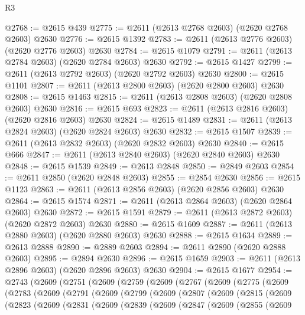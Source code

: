 \begin{lexlean}{R3}
\begin{coremodule}
@2768 := @2615 @439
@2775 := @2611 (@2613 @2768 @2603) (@2620 @2768 @2603) @2630
@2776 := @2615 @1392
@2783 := @2611 (@2613 @2776 @2603) (@2620 @2776 @2603) @2630
@2784 := @2615 @1079
@2791 := @2611 (@2613 @2784 @2603) (@2620 @2784 @2603) @2630
@2792 := @2615 @1427
@2799 := @2611 (@2613 @2792 @2603) (@2620 @2792 @2603) @2630
@2800 := @2615 @1101
@2807 := @2611 (@2613 @2800 @2603) (@2620 @2800 @2603) @2630
@2808 := @2615 @1463
@2815 := @2611 (@2613 @2808 @2603) (@2620 @2808 @2603) @2630
@2816 := @2615 @693
@2823 := @2611 (@2613 @2816 @2603) (@2620 @2816 @2603) @2630
@2824 := @2615 @1489
@2831 := @2611 (@2613 @2824 @2603) (@2620 @2824 @2603) @2630
@2832 := @2615 @1507
@2839 := @2611 (@2613 @2832 @2603) (@2620 @2832 @2603) @2630
@2840 := @2615 @666
@2847 := @2611 (@2613 @2840 @2603) (@2620 @2840 @2603) @2630
@2848 := @2615 @1539
@2849 := @2613 @2848
@2850 := @2849 @2603
@2854 := @2611 @2850 (@2620 @2848 @2603)
@2855 := @2854 @2630
@2856 := @2615 @1123
@2863 := @2611 (@2613 @2856 @2603) (@2620 @2856 @2603) @2630
@2864 := @2615 @1574
@2871 := @2611 (@2613 @2864 @2603) (@2620 @2864 @2603) @2630
@2872 := @2615 @1591
@2879 := @2611 (@2613 @2872 @2603) (@2620 @2872 @2603) @2630
@2880 := @2615 @1609
@2887 := @2611 (@2613 @2880 @2603) (@2620 @2880 @2603) @2630
@2888 := @2615 @1634
@2889 := @2613 @2888
@2890 := @2889 @2603
@2894 := @2611 @2890 (@2620 @2888 @2603)
@2895 := @2894 @2630
@2896 := @2615 @1659
@2903 := @2611 (@2613 @2896 @2603) (@2620 @2896 @2603) @2630
@2904 := @2615 @1677
@2954 := @2743
    (@2609
      (@2751
        (@2609
          (@2759
            (@2609
              (@2767
                (@2609
                  (@2775
                    (@2609
                      (@2783
                        (@2609
                          (@2791
                            (@2609
                              (@2799
                                (@2609
                                  (@2807
                                    (@2609
                                      (@2815
                                        (@2609
                                          (@2823
                                            (@2609
                                              (@2831
                                                (@2609
                                                  (@2839
                                                    (@2609
                                                      (@2847
                                                        (@2609
                                                          (@2855
                                                            (@2609

\end{coremodule}
\end{lexlean}
